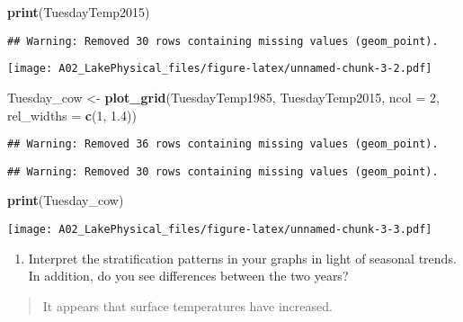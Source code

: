 \documentclass[]{article}
\newenvironment{Shaded}{\begin{snugshade}}{\end{snugshade}}
\newcommand{\DataTypeTok}[1]{\textcolor[rgb]{0.13,0.29,0.53}{#1}}
\newcommand{\DecValTok}[1]{\textcolor[rgb]{0.00,0.00,0.81}{#1}}
\newcommand{\FloatTok}[1]{\textcolor[rgb]{0.00,0.00,0.81}{#1}}
\newcommand{\KeywordTok}[1]{\textcolor[rgb]{0.13,0.29,0.53}{\textbf{#1}}}
\newcommand{\NormalTok}[1]{#1}
\newcommand{\StringTok}[1]{\textcolor[rgb]{0.31,0.60,0.02}{#1}}
\providecommand{\tightlist}{%
  \setlength{\itemsep}{0pt}\setlength{\parskip}{0pt}}
\begin{document}
\begin{Shaded}
\begin{Highlighting}[]
\KeywordTok{print}\NormalTok{(TuesdayTemp2015)}
\end{Highlighting}
\end{Shaded}

\begin{verbatim}
## Warning: Removed 30 rows containing missing values (geom_point).
\end{verbatim}

\texttt{[image: A02\_LakePhysical\_files/figure-latex/unnamed-chunk-3-2.pdf]}

\begin{Shaded}
\begin{Highlighting}[]
\NormalTok{Tuesday_cow <-}\StringTok{ }
\StringTok{  }\KeywordTok{plot_grid}\NormalTok{(TuesdayTemp1985, TuesdayTemp2015, }
            \DataTypeTok{ncol =} \DecValTok{2}\NormalTok{, }\DataTypeTok{rel_widths =} \KeywordTok{c}\NormalTok{(}\DecValTok{1}\NormalTok{, }\FloatTok{1.4}\NormalTok{))}
\end{Highlighting}
\end{Shaded}

\begin{verbatim}
## Warning: Removed 36 rows containing missing values (geom_point).
\end{verbatim}

\begin{verbatim}
## Warning: Removed 30 rows containing missing values (geom_point).
\end{verbatim}

\begin{Shaded}
\begin{Highlighting}[]
\KeywordTok{print}\NormalTok{(Tuesday_cow)}
\end{Highlighting}
\end{Shaded}

\texttt{[image: A02\_LakePhysical\_files/figure-latex/unnamed-chunk-3-3.pdf]}

\begin{enumerate}
\def\labelenumi{\arabic{enumi}.}
\setcounter{enumi}{6}
\tightlist
\item
  Interpret the stratification patterns in your graphs in light of
  seasonal trends. In addition, do you see differences between the two
  years?
\end{enumerate}

\begin{quote}
It appears that surface temperatures have increased.
\end{quote}
\end{document}
